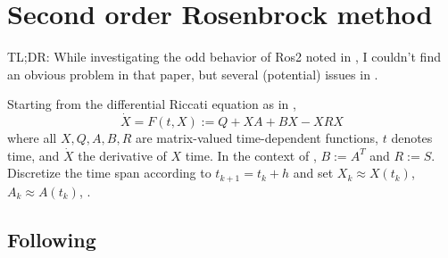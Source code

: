 \chapter{Second order Rosenbrock method}

TL;DR:
While investigating the odd behavior of Ros2 noted in \cite[63]{Lang2015},
I couldn't find an obvious problem in that paper,
but several (potential) issues in \cite{Mena2007,MPIMD11-06,MPIMD12-13}.
\bigskip

Starting from the differential Riccati equation as in \cite{MPIMD11-06},
\begin{equation}
  \dot X = F(t, X) := Q + XA + BX - XRX
\end{equation}
where all $X, Q, A, B, R$ are matrix-valued time-dependent functions,
$t$ denotes time, and $\dot X$ the derivative of $X$ \wrt time.
In the context of \cite{Mena2007,MPIMD12-13,Lang2015}, $B:=A^T$ and $R:=S$.
Discretize the time span according to $t_{k+1} = t_k + h$
and set $X_k \approx X(t_k)$, $A_k \approx A(t_k)$, \etc.

\section{Following \cite{Mena2007}}

